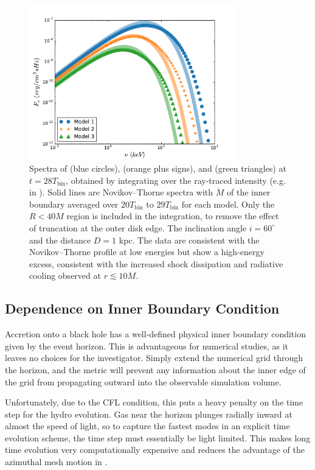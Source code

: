 \begin{figure}
	\begin{center}
	\includegraphics[width=0.8\textwidth]{figures/minidisk/q011_spec_all.pdf}
	\end{center}
	\caption{ Spectra of  (blue circles),  (orange plus signs), and  (green triangles) at $t = 28 T_\text{bin}$, obtained by integrating over the ray-traced intensity (e.g. in ).  Solid lines are Novikov--Thorne spectra with $\dot{M}$ of the inner boundary averaged over $20 T_\text{bin}$ to $29 T_\text{bin}$ for each model.  Only the $R<40M$ region is included in the integration, to remove the effect of truncation at the outer disk edge.  The inclination angle $i=60^\circ$ and the distance $D=1$ kpc.  The data are consistent with the Novikov--Thorne profile at low energies but show a high-energy excess, consistent with the increased shock dissipation and radiative cooling observed at $r\lesssim 10M$.}
\end{figure}

\subsection{Dependence on Inner Boundary Condition}

Accretion onto a black hole has a well-defined physical inner boundary condition given by the event horizon.  This is advantageous for numerical studies, as it leaves no choices for the investigator. Simply extend the numerical grid through the horizon, and the metric will prevent any information about the inner edge of the grid from propagating outward into the observable simulation volume.  

Unfortunately, due to the CFL condition, this puts a heavy penalty on the time step for the hydro evolution.  Gas near the horizon plunges radially inward at almost the speed of light, so to capture the fastest modes in an explicit time evolution scheme, the time step must essentially be light limited. This makes long time evolution very computationally expensive and reduces the advantage of the azimuthal mesh motion in \Disco{}.


